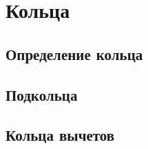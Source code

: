 \section{Кольца}
\subsection{Определение кольца}

\subsection{Подкольца}

\subsection{Кольца вычетов}

